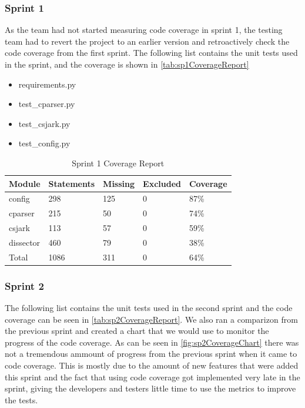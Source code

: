 \subsubsection{Sprint 1}
As the team had not started measuring code coverage in sprint 1, the testing team had to revert the project to an earlier version and retroactively check the code coverage from the first sprint. The following list contains the unit tests used in the sprint, and the coverage is shown in \autoref{tab:sp1CoverageReport}

\begin {itemize}
\item requirements.py
\item test\_cparser.py
\item test\_csjark.py
\item test\_config.py
\end{itemize}

\begin{table}[!htb]\footnotesize\center
	\caption{Sprint 1 Coverage Report\label{tab:sp1CoverageReport}}
	\begin{tabular}{l l l l l}
		\toprule
		Module & Statements & Missing & Excluded & Coverage\\
		\midrule
		config & 298 & 125 & 0 & 87\%\ \\
		cparser & 215 & 50 & 0 & 74\%\ \\
		csjark & 113 & 57 & 0 & 59\%\ \\
		\gls{dissector} & 460 & 79 & 0 & 38\%\ \\
		Total & 1086 & 311 & 0 & 64\%\ \\
		\bottomrule
	\end{tabular}
\end{table}

\subsubsection{Sprint 2}
The following list contains the unit tests used in the second sprint and the code coverage can be seen in \autoref{tab:sp2CoverageReport}. We also ran a comparizon from the previous sprint and created a chart that we would use to monitor the progress of the code coverage. As can be seen in \autoref{fig:sp2CoverageChart} there was not a tremendous ammount of progress from the previous sprint when it came to code coverage. This is mostly due to the amount of new features that were added this sprint and the fact that using code coverage got implemented very late in the sprint, giving the developers and testers little time to use the metrics to improve the tests.

